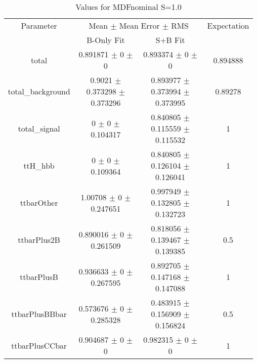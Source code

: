 \begin{table}
\centering
\caption{Values for MDFnominal S=1.0}
\begin{tabular}{cccc}
\toprule
Parameter & \multicolumn{2}{c}{Mean $\pm$ Mean Error $\pm$ RMS} & Expectation\\
 & B-Only Fit & S+B Fit & \\
\midrule
total & \num{0.891871} $\pm$ \num{0} $\pm$ \num{0} & \num{0.893374} $\pm$ \num{0} $\pm$ \num{0} & \num{0.894888}\\
total\_background & \num{0.9021} $\pm$ \num{0.373298} $\pm$ \num{0.373296} & \num{0.893977} $\pm$ \num{0.373994} $\pm$ \num{0.373995} & \num{0.89278}\\
total\_signal & \num{0} $\pm$ \num{0} $\pm$ \num{0.104317} & \num{0.840805} $\pm$ \num{0.115559} $\pm$ \num{0.115532} & \num{1}\\
ttH\_hbb & \num{0} $\pm$ \num{0} $\pm$ \num{0.109364} & \num{0.840805} $\pm$ \num{0.126104} $\pm$ \num{0.126041} & \num{1}\\
ttbarOther & \num{1.00708} $\pm$ \num{0} $\pm$ \num{0.247651} & \num{0.997949} $\pm$ \num{0.132805} $\pm$ \num{0.132723} & \num{1}\\
ttbarPlus2B & \num{0.890016} $\pm$ \num{0} $\pm$ \num{0.261509} & \num{0.818056} $\pm$ \num{0.139467} $\pm$ \num{0.139385} & \num{0.5}\\
ttbarPlusB & \num{0.936633} $\pm$ \num{0} $\pm$ \num{0.267595} & \num{0.892705} $\pm$ \num{0.147168} $\pm$ \num{0.147088} & \num{1}\\
ttbarPlusBBbar & \num{0.573676} $\pm$ \num{0} $\pm$ \num{0.285328} & \num{0.483915} $\pm$ \num{0.156909} $\pm$ \num{0.156824} & \num{0.5}\\
ttbarPlusCCbar & \num{0.904687} $\pm$ \num{0} $\pm$ \num{0} & \num{0.982315} $\pm$ \num{0} $\pm$ \num{0} & \num{1}\\
\bottomrule
\end{tabular}
\end{table}